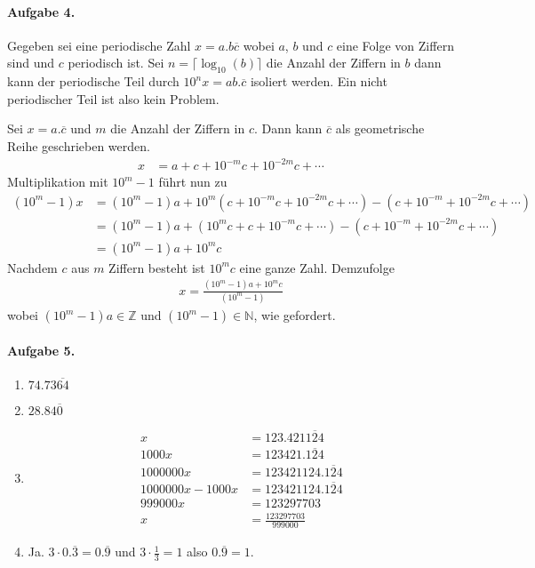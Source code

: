 \documentclass{article}
\begin{document}
\paragraph{Aufgabe 4.} Gegeben sei eine periodische Zahl $x = a.b\overline{c}$ wobei $a$, $b$ und $c$ eine Folge von Ziffern sind und $c$ periodisch ist. Sei $n = \lceil\log_{10}(b)\rceil$ die Anzahl der Ziffern in $b$ dann kann der periodische Teil durch $10^nx = ab.\overline{c}$ isoliert werden. Ein nicht periodischer Teil ist also kein Problem.

Sei $x = a.\overline{c}$ und $m$ die Anzahl der Ziffern in $c$. Dann kann $\overline{c}$ als geometrische Reihe geschrieben werden.
\begin{align*}
    x &= a + c + 10^{-m}c + 10^{-2m}c + \cdots
\end{align*}
Multiplikation mit $10^m - 1$ führt nun zu
\begin{align*}
    (10^m - 1)x &= (10^m - 1)a + 10^{m}(c + 10^{-m}c + 10^{-2m}c + \cdots) - (c + 10^{-m} + 10^{-2m}c + \cdots) \\
    &= (10^m - 1)a + (10^{m}c + c + 10^{-m}c + \cdots) - (c + 10^{-m} + 10^{-2m}c + \cdots) \\
    &= (10^m - 1)a + 10^{m}c
\end{align*}
Nachdem $c$ aus $m$ Ziffern besteht ist $10^mc$ eine ganze Zahl. Demzufolge
\begin{align*}
    x = \frac{(10^m - 1)a + 10^mc}{(10^m - 1)}
\end{align*}
wobei $(10^m - 1)a \in \mathbb{Z}$ und $(10^m - 1) \in \mathbb{N}$, wie gefordert.

\paragraph{Aufgabe 5.}
\begin{enumerate}
    \item $74.73\overline{64}$
    \item $28.84\overline{0}$
    \item \begin{align*}
        x &= 123.421\overline{124} \\
        1000x &= 123421.\overline{124} \\
        1000000x &= 123421124.\overline{124} \\
        1000000x - 1000x &= 123421124.\overline{124} \\
        999000x &= 123297703 \\
        x &= \frac{123297703}{999000}
    \end{align*}
    \item Ja. $3 \cdot 0.\overline{3} = 0.\overline{9}$ und $3 \cdot \frac{1}{3} = 1$ also $0.\overline{9} = 1$.
\end{enumerate}
\end{document}
